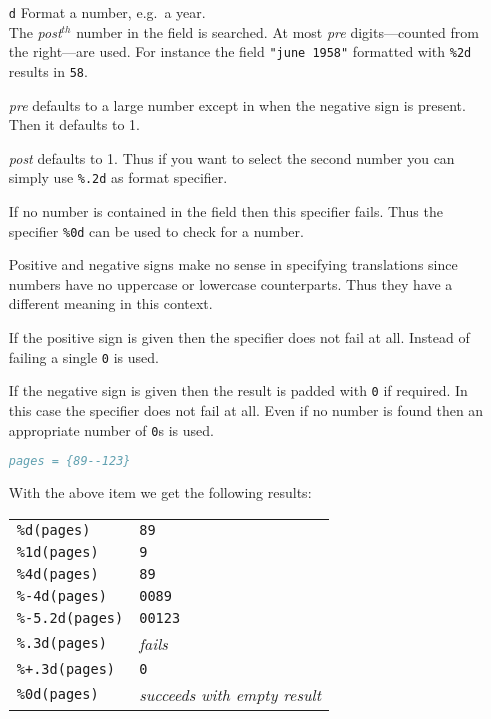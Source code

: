 \documentclass[11pt,a4paper]{scrbook}
\begin{document}
\begin{itemize}
  \item [\texttt{d}] Format a number, e.g.\ a year.\\
    
    The \textit{post}$^{th}$ number in the field is searched. At most
    \textit{pre} digits---counted from the right---are used. For instance
    the field \texttt{"june 1958"} formatted with \texttt{\%2d} results in
    \texttt{58}.
    
    \textit{pre} defaults to a large number except in when the negative sign
    is present. Then it defaults to 1.
        
    \textit{post} defaults to 1. Thus if you want to select the second number
    you can simply use \texttt{\%.2d} as format specifier.
        
    If no number is contained in the field then this specifier fails. Thus the
    specifier \texttt{\%0d} can be used to check for a number.
    
    Positive and negative signs make no sense in specifying translations since
    numbers have no uppercase or lowercase counterparts. Thus they have a
    different meaning in this context.
    
    If the positive sign is given then the specifier does not fail at all.
    Instead of failing a single \verb|0| is used.
    
    If the negative sign is given then the result is padded with \verb|0| if
    required. In this case the specifier does not fail at all. Even if no
    number is found then an appropriate number of \verb|0|s is used.

    \begin{Example}
      \begin{lstlisting}[language=BibTeX]
  pages = {89--123}
      \end{lstlisting}\vspace{-2ex}
      With the above item we get the following results:
      
      \begin{tabular}{ll}
        \texttt{\%d(pages)}	& \texttt{89}			\\
        \texttt{\%1d(pages)}	& \texttt{9}			\\
        \texttt{\%4d(pages)}	& \texttt{89}			\\
        \texttt{\%-4d(pages)}	& \texttt{0089}			\\
        \texttt{\%-5.2d(pages)}	& \texttt{00123}		\\
        \texttt{\%.3d(pages)}	& \textit{fails}		\\
        \texttt{\%+.3d(pages)}	& \texttt{0}			\\
        \texttt{\%0d(pages)}	& \textit{succeeds with empty result}
      \end{tabular}
    \end{Example}


\end{itemize}
\end{document}
